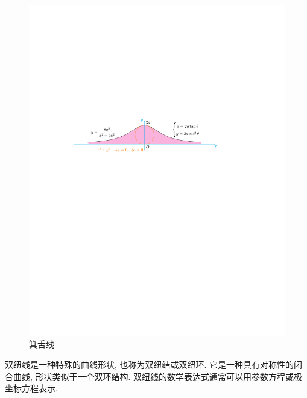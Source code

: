 \begin{figure}[H]
    \centering
    \includegraphics{figures/MiTongueLine.pdf}
    \caption{箕舌线}
    \label{miTongueLine}
\end{figure}


双纽线是一种特殊的曲线形状, 也称为双纽结或双纽环. 它是一种具有对称性的闭合曲线, 形状类似于一个双环结构. 双纽线的数学表达式通常可以用参数方程或极坐标方程表示.

